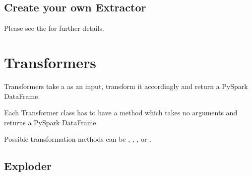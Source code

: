 \documentclass[a4paper,10pt, twoside,english]{sphinxmanual}
\begin{document}
\subsection{Create your own Extractor}
\label{\detokenize{extractor/overview:create-your-own-extractor}}
Please see the {\hyperref[\detokenize{base_classes/extractor:custom-extractor}]{}} for further details.


\section{Transformers}
\label{\detokenize{transformer/overview:module-spooq2.transformer.transformer}}\label{\detokenize{transformer/overview:transformers}}\label{\detokenize{transformer/overview::doc}}
Transformers take a  as an input, transform it accordingly
and return a PySpark DataFrame.

Each Transformer class has to have a  method which takes no arguments
and returns a PySpark DataFrame.

Possible transformation methods can be ,
, ,  or
.


\subsection{Exploder}
\label{\detokenize{transformer/exploder:module-spooq2.transformer.exploder}}\label{\detokenize{transformer/exploder:exploder}}\label{\detokenize{transformer/exploder::doc}}
\end{document}
